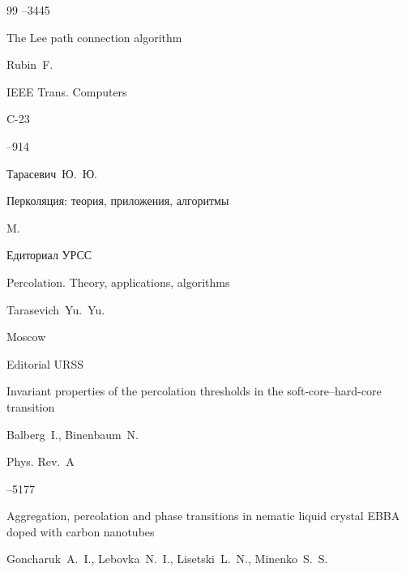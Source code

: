 {\begin{thebibliography}{99}
--3445




\paper The Lee path connection algorithm

\by Rubin~F.

\jour IEEE Trans. Computers


\vol C-23


--914








\by Тарасевич~Ю.~Ю.

\book Перколяция: теория, приложения, алгоритмы

\publaddr M.

\publ Едиториал УРСС



\misctransl

\book Percolation. Theory, applications, algorithms 

\by Tarasevich~Yu.~Yu.

\publaddr Moscow

\publ Editorial URSS






\paper Invariant properties of the percolation thresholds in the soft-core–hard-core transition

\by Balberg~I., Binenbaum~N.

\jour Phys. Rev.~A




--5177







\paper Aggregation, percolation and phase transitions in nematic liquid crystal EBBA doped with carbon nanotubes

\by    Goncharuk~A.~I., Lebovka~N.~I., Lisetski~L.~N., Minenko~S.~S.


\end{thebibliography}}
